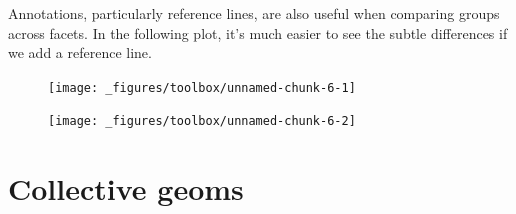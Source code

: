 Annotations, particularly reference lines, are also useful when
comparing groups across facets. In the following plot, it's much easier
to see the subtle differences if we add a reference line.

\begin{Shaded}
\begin{Highlighting}[]
\NormalTok{(}\StringTok{ }
\StringTok{  }\NormalTok{() +}\StringTok{ }
\StringTok{  } \NormalTok{)}
\end{Highlighting}
\end{Shaded}

\begin{figure}[H]
  \texttt{[image: \_figures/toolbox/unnamed-chunk-6-1]}%
\end{figure}

\begin{Shaded}
\begin{Highlighting}[]

\StringTok{ }\NormalTok{(}\NormalTok{(}\StringTok{ } 
\NormalTok{(}\StringTok{ }
\StringTok{  }\NormalTok{() +}\StringTok{ }
\StringTok{  }\NormalTok{(} \NormalTok{mod_coef[}\NormalTok{], } \NormalTok{mod_coef[}\NormalTok{], }
     \NormalTok{, } \NormalTok{) +}\StringTok{ }
\StringTok{  } \NormalTok{)}
\end{Highlighting}
\end{Shaded}

\begin{figure}[H]
  \texttt{[image: \_figures/toolbox/unnamed-chunk-6-2]}
\end{figure}

\hypertarget{sec:grouping}{\section{Collective
geoms}\label{sec:grouping}}

